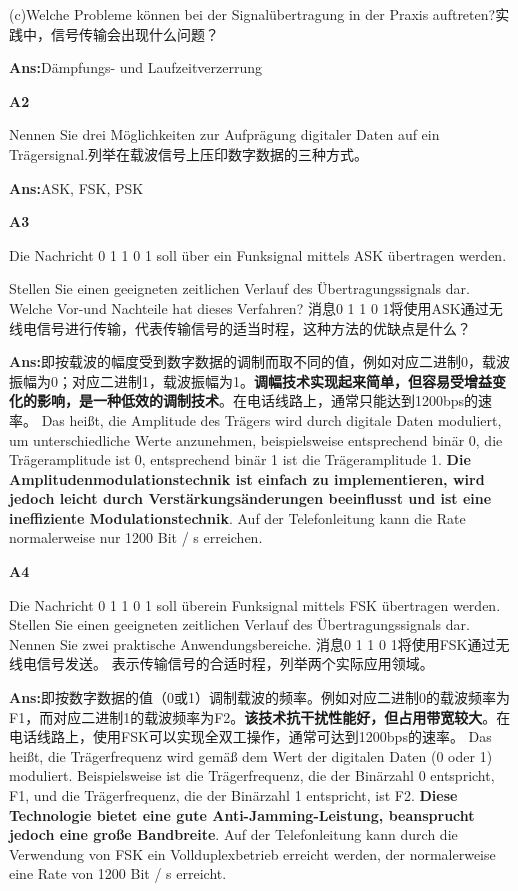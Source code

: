 \documentclass[fleqn]{article}
\begin{document}
(c)Welche Probleme können bei der Signalübertragung in der Praxis auftreten?实践中，信号传输会出现什么问题？

\textbf{Ans:}Dämpfungs- und Laufzeitverzerrung

\noindent\textbf{A2}

Nennen Sie drei Möglichkeiten zur Aufprägung digitaler Daten auf ein Trägersignal.列举在载波信号上压印数字数据的三种方式。

\textbf{Ans:}ASK, FSK, PSK

\noindent\textbf{A3}

Die Nachricht 0 1 1 0 1 soll über ein Funksignal mittels ASK übertragen werden.

Stellen Sie einen geeigneten zeitlichen Verlauf des Übertragungssignals dar. Welche Vor-und Nachteile hat dieses Verfahren?
消息0 1 1 0 1将使用ASK通过无线电信号进行传输，代表传输信号的适当时程，这种方法的优缺点是什么？

\textbf{Ans:}即按载波的幅度受到数字数据的调制而取不同的值，例如对应二进制0，载波振幅为0；对应二进制1，载波振幅为1。{\bfseries 调幅技术实现起来简单，但容易受增益变化的影响，是一种低效的调制技术}。在电话线路上，通常只能达到1200bps的速率。
Das heißt, die Amplitude des Trägers wird durch digitale Daten moduliert, um unterschiedliche Werte anzunehmen, beispielsweise entsprechend binär 0, die Trägeramplitude ist 0, entsprechend binär 1 ist die Trägeramplitude 1. {\bfseries Die Amplitudenmodulationstechnik ist einfach zu implementieren, wird jedoch leicht durch Verstärkungsänderungen beeinflusst und ist eine ineffiziente Modulationstechnik}. Auf der Telefonleitung kann die Rate normalerweise nur 1200 Bit / s erreichen.

\noindent\textbf{A4}

Die Nachricht 0 1 1 0 1 soll überein Funksignal mittels FSK übertragen werden. Stellen Sie einen geeigneten zeitlichen Verlauf des Übertragungssignals dar. Nennen Sie zwei praktische Anwendungsbereiche.
消息0 1 1 0 1将使用FSK通过无线电信号发送。 表示传输信号的合适时程，列举两个实际应用领域。

\textbf{Ans:}即按数字数据的值（0或1）调制载波的频率。例如对应二进制0的载波频率为F1，而对应二进制1的载波频率为F2。{\bfseries 该技术抗干扰性能好，但占用带宽较大}。在电话线路上，使用FSK可以实现全双工操作，通常可达到1200bps的速率。
Das heißt, die Trägerfrequenz wird gemäß dem Wert der digitalen Daten (0 oder 1) moduliert. Beispielsweise ist die Trägerfrequenz, die der Binärzahl 0 entspricht, F1, und die Trägerfrequenz, die der Binärzahl 1 entspricht, ist F2. {\bfseries Diese Technologie bietet eine gute Anti-Jamming-Leistung, beansprucht jedoch eine große Bandbreite}. Auf der Telefonleitung kann durch die Verwendung von FSK ein Vollduplexbetrieb erreicht werden, der normalerweise eine Rate von 1200 Bit / s erreicht.
\end{document}
